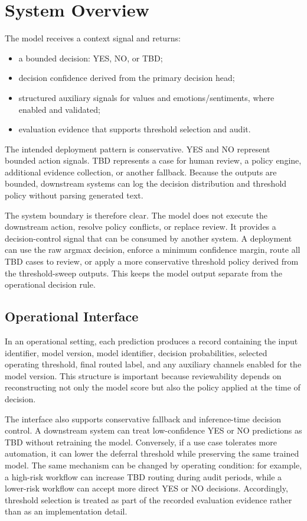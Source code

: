 \documentclass[11pt]{article}
\begin{document}
\section{System Overview}

The model receives a context signal and returns:
\begin{itemize}[leftmargin=1.5em]
  \item a bounded decision: YES, NO, or TBD;
  \item decision confidence derived from the primary decision head;
  \item structured auxiliary signals for values and emotions/sentiments, where enabled and validated;
  \item evaluation evidence that supports threshold selection and audit.
\end{itemize}

The intended deployment pattern is conservative. YES and NO represent bounded action signals. TBD represents a case for human review, a policy engine, additional evidence collection, or another fallback. Because the outputs are bounded, downstream systems can log the decision distribution and threshold policy without parsing generated text.

The system boundary is therefore clear. The model does not execute the downstream action, resolve policy conflicts, or replace review. It provides a decision-control signal that can be consumed by another system. A deployment can use the raw argmax decision, enforce a minimum confidence margin, route all TBD cases to review, or apply a more conservative threshold policy derived from the threshold-sweep outputs. This keeps the model output separate from the operational decision rule.

\subsection{Operational Interface}

In an operational setting, each prediction produces a record containing the input identifier, model version, model identifier, decision probabilities, selected operating threshold, final routed label, and any auxiliary channels enabled for the model version. This structure is important because reviewability depends on reconstructing not only the model score but also the policy applied at the time of decision.

The interface also supports conservative fallback and inference-time decision control. A downstream system can treat low-confidence YES or NO predictions as TBD without retraining the model. Conversely, if a use case tolerates more automation, it can lower the deferral threshold while preserving the same trained model. The same mechanism can be changed by operating condition: for example, a high-risk workflow can increase TBD routing during audit periods, while a lower-risk workflow can accept more direct YES or NO decisions. Accordingly, threshold selection is treated as part of the recorded evaluation evidence rather than as an implementation detail.
\end{document}
